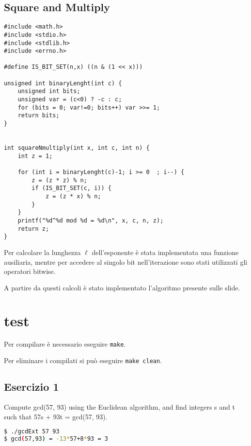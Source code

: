 \documentclass{article}
\begin{document}
\subsection{Square and Multiply}
\begin{lstlisting}[style=CStyle]
#include <math.h>
#include <stdio.h>
#include <stdlib.h>
#include <errno.h>

#define IS_BIT_SET(n,x) ((n & (1 << x)))

unsigned int binaryLenght(int c) {
    unsigned int bits;                              
    unsigned var = (c<0) ? -c : c;              
    for (bits = 0; var!=0; bits++) var >>= 1;                                    
    return bits;
}


int squareNmultiply(int x, int c, int n) {
    int z = 1;
    
    for (int i = binaryLenght(c)-1; i >= 0  ; i--) {
        z = (z * z) % n;
        if (IS_BIT_SET(c, i)) {
            z = (z * x) % n;
        }
    }
    printf("%d^%d mod %d = %d\n", x, c, n, z);
    return z;
}
\end{lstlisting}
Per calcolare la lunghezza \(\ell\) dell'esponente \`{e} stata implementata una funzione ausiliaria, mentre per accedere al singolo bit nell'iterazione sono stati utilizzati gli operatori bitwise. 

A partire da questi calcoli \`{e} stato implementato l'algoritmo presente sulle slide.

\section{test}
Per compilare \`{e} necessario eseguire \lstinline{make}.

Per eliminare i compilati si pu\`{o} eseguire \lstinline{make clean}.
\subsection{Esercizio 1}
Compute gcd(57, 93) using the Euclidean algorithm, and find integers s and t such that 57s + 93t = gcd(57, 93).

\begin{lstlisting}[language=bash]
$ ./gcdExt 57 93        
$ gcd(57,93) = -13*57+8*93 = 3
\end{lstlisting}
\end{document}
